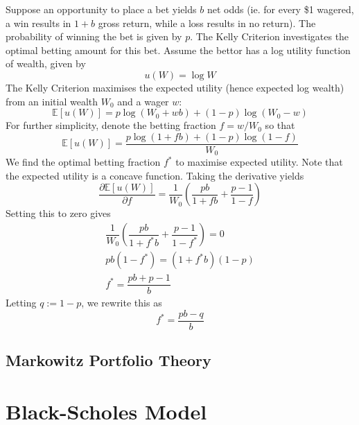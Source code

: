 \documentclass[11pt]{report} %
\begin{document}
Suppose an opportunity to place a bet yields $b$ net odds (ie. for every \$1 wagered, a win results in $1 + b$ gross return, while a loss results in no return). The probability of winning the bet is given by $p$. The Kelly Criterion investigates the optimal betting amount for this bet. Assume the bettor has a log utility function of wealth, given by
\begin{equation}
u\left(W\right) = \log W
\end{equation}
The Kelly Criterion maximises the expected utility (hence expected log wealth) from an initial wealth $W_{0}$ and a wager $w$:
\begin{equation}
\mathbb{E}\left[u\left(W\right)\right] = p\log\left(W_{0} + wb\right) + \left(1 - p\right)\log\left(W_{0} - w\right)
\end{equation}
For further simplicity, denote the betting fraction $f = w/W_{0}$ so that
\begin{equation}
\mathbb{E}\left[u\left(W\right)\right] = \dfrac{p\log\left(1 + fb\right) + \left(1 - p\right)\log\left(1 - f\right)}{W_{0}}
\end{equation}
We find the optimal betting fraction $f^{*}$ to maximise expected utility. Note that the expected utility is a concave function. Taking the derivative yields
\begin{equation}
\dfrac{\partial \mathbb{E}\left[u\left(W\right)\right]}{\partial f} = \dfrac{1}{W_{0}}\left(\dfrac{pb}{1 + fb} + \dfrac{p - 1}{1 - f}\right)
\end{equation}
Setting this to zero gives
\begin{gather}
\dfrac{1}{W_{0}}\left(\dfrac{pb}{1 + f^{*}b} + \dfrac{p - 1}{1 - f^{*}}\right) = 0 \\
pb\left(1 - f^{*}\right) = \left(1 + f^{*}b\right)\left(1 - p\right) \\
f^{*} = \dfrac{pb + p - 1}{b}
\end{gather}
Letting $q := 1 - p$, we rewrite this as
\begin{equation}
f^{*} = \dfrac{pb - q}{b}
\end{equation}

\subsection{Markowitz Portfolio Theory}

\section{Black-Scholes Model}
\end{document}
